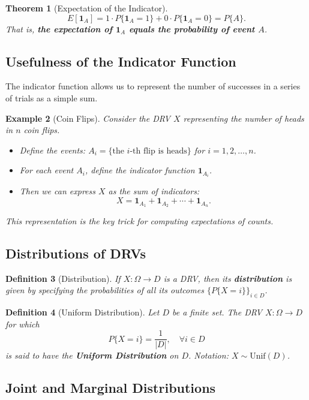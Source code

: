 \documentclass[12pt]{article}
\theoremstyle{definition_style}
\newtheorem{defn}{Definition}[section]
\newtheorem{thm}[defn]{Theorem}
\newtheorem{example}[defn]{Example}
\begin{document}
\begin{thm}[Expectation of the Indicator]
\[
    E[\mathbf{1}_A] = 1 \cdot P\{\mathbf{1}_A = 1\} + 0 \cdot P\{\mathbf{1}_A = 0\} = P\{A\}.
\]
That is, \textbf{the expectation of $\mathbf{1}_A$ equals the probability of event $A$}.
\end{thm}

\subsection{Usefulness of the Indicator Function}

The indicator function allows us to represent the number of successes in a series of trials as a simple sum.

\begin{example}[Coin Flips]
Consider the DRV $X$ representing the number of heads in $n$ coin flips.
\begin{itemize}
    \item Define the events: $A_i = \{\text{the } i\text{-th flip is heads}\}$ for $i = 1, 2, \ldots, n$.
    \item For each event $A_i$, define the indicator function $\mathbf{1}_{A_i}$.
    \item Then we can express $X$ as the sum of indicators:
    \[
        X = \mathbf{1}_{A_1} + \mathbf{1}_{A_2} + \cdots + \mathbf{1}_{A_n}.
    \]
\end{itemize}
This representation is the key trick for computing expectations of counts.
\end{example}

\subsection{Distributions of DRVs}

\begin{defn}[Distribution]
If $X: \Omega \to D$ is a DRV, then its \textbf{distribution} is given by specifying the probabilities of all its outcomes $\{P\{X = i\}\}_{i \in D}$.
\end{defn}

\begin{defn}[Uniform Distribution]
Let $D$ be a finite set. The DRV $X: \Omega \to D$ for which
\[
    P\{X = i\} = \frac{1}{|D|}, \quad \forall i \in D
\]
is said to have the \textbf{Uniform Distribution} on $D$. Notation: $X \sim \mathrm{Unif}(D)$.
\end{defn}

\subsection{Joint and Marginal Distributions}
\end{document}
